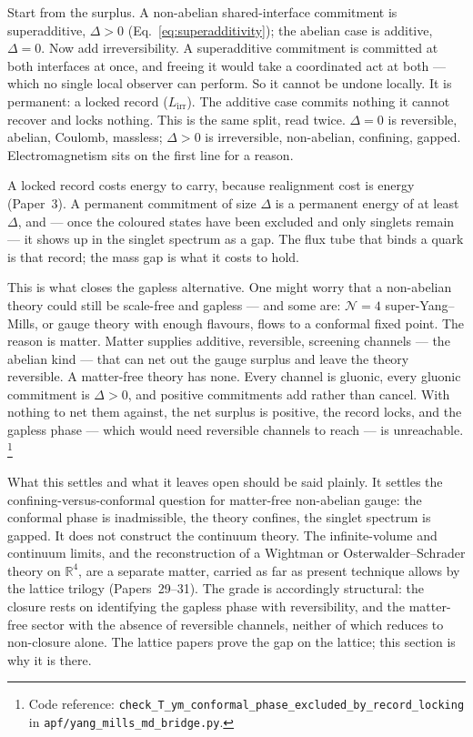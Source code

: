 \documentclass[11pt]{article}
\newcommand{\coderef}[2]{\footnote{Code reference: \texttt{#1} in \texttt{#2}.}}
\begin{document}
Start from the surplus.  A non-abelian shared-interface commitment is superadditive, $\Delta > 0$ (Eq.~\ref{eq:superadditivity}); the abelian case is additive, $\Delta = 0$.  Now add irreversibility.  A superadditive commitment is committed at both interfaces at once, and freeing it would take a coordinated act at both --- which no single local observer can perform.  So it cannot be undone locally.  It is permanent: a locked record ($L_{\mathrm{irr}}$).  The additive case commits nothing it cannot recover and locks nothing.  This is the same split, read twice.  $\Delta = 0$ is reversible, abelian, Coulomb, massless; $\Delta > 0$ is irreversible, non-abelian, confining, gapped.  Electromagnetism sits on the first line for a reason.

A locked record costs energy to carry, because realignment cost is energy (Paper~3).  A permanent commitment of size $\Delta$ is a permanent energy of at least $\Delta$, and --- once the coloured states have been excluded and only singlets remain --- it shows up in the singlet spectrum as a gap.  The flux tube that binds a quark is that record; the mass gap is what it costs to hold.

This is what closes the gapless alternative.  One might worry that a non-abelian theory could still be scale-free and gapless --- and some are: $\mathcal{N}=4$ super-Yang--Mills, or gauge theory with enough flavours, flows to a conformal fixed point.  The reason is matter.  Matter supplies additive, reversible, screening channels --- the abelian kind --- that can net out the gauge surplus and leave the theory reversible.  A matter-free theory has none.  Every channel is gluonic, every gluonic commitment is $\Delta > 0$, and positive commitments add rather than cancel.  With nothing to net them against, the net surplus is positive, the record locks, and the gapless phase --- which would need reversible channels to reach --- is unreachable.
\coderef{check\_T\_ym\_conformal\_phase\_excluded\_by\_record\_locking}{apf/yang\_mills\_md\_bridge.py}

What this settles and what it leaves open should be said plainly.  It settles the confining-versus-conformal question for matter-free non-abelian gauge: the conformal phase is inadmissible, the theory confines, the singlet spectrum is gapped.  It does not construct the continuum theory.  The infinite-volume and continuum limits, and the reconstruction of a Wightman or Osterwalder--Schrader theory on $\mathbb{R}^4$, are a separate matter, carried as far as present technique allows by the lattice trilogy (Papers~29--31).  The grade is accordingly structural: the closure rests on identifying the gapless phase with reversibility, and the matter-free sector with the absence of reversible channels, neither of which reduces to non-closure alone.  The lattice papers prove the gap on the lattice; this section is why it is there.
\end{document}
